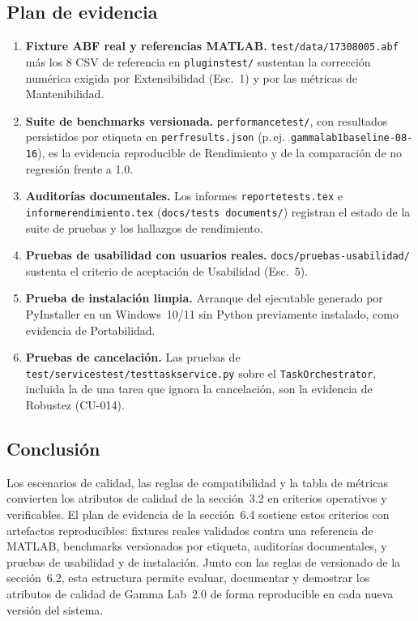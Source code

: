 \documentclass[11pt,a4paper]{article}
\DeclareRobustCommand{\_}{\textunderscore\allowbreak}
\begin{document}
\subsection{Plan de evidencia}
\begin{enumerate}
    \item \textbf{Fixture ABF real y referencias MATLAB.} \texttt{test/data/17308005.abf} m\'as los 8 CSV de referencia en \texttt{plugins\_\allowbreak test/} sustentan la correcci\'on num\'erica exigida por Extensibilidad (Esc.~1) y por las m\'etricas de Mantenibilidad.
    \item \textbf{Suite de benchmarks versionada.} \texttt{performance\_\allowbreak test/}, con resultados persistidos por etiqueta en \texttt{perf\_\allowbreak results.json} (p.\,ej.\ \texttt{gammalab1\_\allowbreak baseline\_-08-16}), es la evidencia reproducible de Rendimiento y de la comparaci\'on de no regresi\'on frente a 1.0.
    \item \textbf{Auditor\'ias documentales.} Los informes \texttt{reporte\_\allowbreak tests.\allowbreak tex} e \texttt{informe\_\allowbreak rendimiento.\allowbreak tex} (\texttt{docs/\allowbreak tests documents/}) registran el estado de la suite de pruebas y los hallazgos de rendimiento.
    \item \textbf{Pruebas de usabilidad con usuarios reales.} \texttt{docs/pruebas-usabilidad/} sustenta el criterio de aceptaci\'on de Usabilidad (Esc.~5).
    \item \textbf{Prueba de instalaci\'on limpia.} Arranque del ejecutable generado por PyInstaller en un Windows~10/11 sin Python previamente instalado, como evidencia de Portabilidad.
    \item \textbf{Pruebas de cancelaci\'on.} Las pruebas de \texttt{test/\allowbreak services\_\allowbreak test/\allowbreak test\_\allowbreak task\_\allowbreak service.py} sobre el \texttt{Task\-Orchestrator}, incluida la de una tarea que ignora la cancelaci\'on, son la evidencia de Robustez (CU-014).
\end{enumerate}

\subsection{Conclusi\'on}

Los escenarios de calidad, las reglas de compatibilidad y la tabla de m\'etricas convierten los atributos de calidad de la secci\'on~3.2 en criterios operativos y verificables. El plan de evidencia de la secci\'on~6.4 sostiene estos criterios con artefactos reproducibles: fixtures reales validados contra una referencia de MATLAB, benchmarks versionados por etiqueta, auditor\'ias documentales, y pruebas de usabilidad y de instalaci\'on. Junto con las reglas de versionado de la secci\'on~6.2, esta estructura permite evaluar, documentar y demostrar los atributos de calidad de Gamma Lab~2.0 de forma reproducible en cada nueva versi\'on del sistema.
\end{document}
